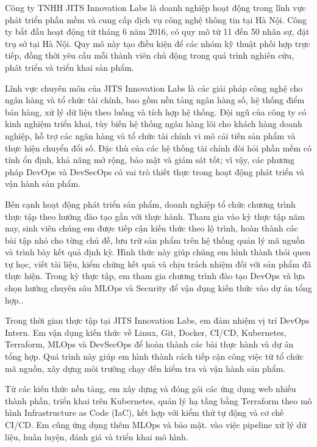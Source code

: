 Công ty TNHH JITS Innovation Labs là doanh nghiệp hoạt động trong lĩnh vực phát triển phần mềm và cung cấp dịch vụ công nghệ thông tin tại Hà Nội. Công ty bắt đầu hoạt động từ tháng 6 năm 2016, có quy mô từ 11 đến 50 nhân sự, đặt trụ sở tại Hà Nội. Quy mô này tạo điều kiện để các nhóm kỹ thuật phối hợp trực tiếp, đồng thời yêu cầu mỗi thành viên chủ động trong quá trình nghiên cứu, phát triển và triển khai sản phẩm.

Lĩnh vực chuyên môn của JITS Innovation Labs là các giải pháp công nghệ cho ngân hàng và tổ chức tài chính, bao gồm nền tảng ngân hàng số, hệ thống điểm bán hàng, xử lý dữ liệu theo luồng và tích hợp hệ thống. Đội ngũ của công ty có kinh nghiệm triển khai, tùy biến hệ thống ngân hàng lõi cho khách hàng doanh nghiệp, hỗ trợ các ngân hàng và tổ chức tài chính vi mô cải tiến sản phẩm và thực hiện chuyển đổi số. Đặc thù của các hệ thống tài chính đòi hỏi phần mềm có tính ổn định, khả năng mở rộng, bảo mật và giám sát tốt; vì vậy, các phương pháp DevOps và DevSecOps có vai trò thiết thực trong hoạt động phát triển và vận hành sản phẩm.

Bên cạnh hoạt động phát triển sản phẩm, doanh nghiệp tổ chức chương trình thực tập theo hướng đào tạo gắn với thực hành. Tham gia vào kỳ thực tập năm nay, sinh viên chúng em được tiếp cận kiến thức theo lộ trình, hoàn thành các bài tập nhỏ cho từng chủ đề, lưu trữ sản phẩm trên hệ thống quản lý mã nguồn và trình bày kết quả định kỳ. Hình thức này giúp chúng em hình thành thói quen tự học, viết tài liệu, kiểm chứng kết quả và chịu trách nhiệm đối với sản phẩm đã thực hiện. Trong kỳ thực tập, em tham gia chương trình đào tạo DevOps và lựa chọn hướng chuyên sâu MLOps và Security để vận dụng kiến thức vào dự án tổng hợp.\cite{jits-home,jits-linkedin,business-registry}.

Trong thời gian thực tập tại JITS Innovation Labs, em đảm nhiệm vị trí DevOps Intern. Em vận dụng kiến thức về Linux, Git, Docker, CI/CD, Kubernetes, Terraform, MLOps và DevSecOps để hoàn thành các bài thực hành và dự án tổng hợp. Quá trình này giúp em hình thành cách tiếp cận công việc từ tổ chức mã nguồn, xây dựng môi trường chạy đến kiểm tra và vận hành sản phẩm.

Từ các kiến thức nền tảng, em xây dựng và đóng gói các ứng dụng web nhiều thành phần, triển khai trên Kubernetes, quản lý hạ tầng bằng Terraform theo mô hình Infrastructure as Code (IaC), kết hợp với kiểm thử tự động và cơ chế CI/CD. Em cũng ứng dụng thêm MLOps và bảo mật. vào việc pipeline xử lý dữ liệu, huấn luyện, đánh giá và triển khai mô hình.

